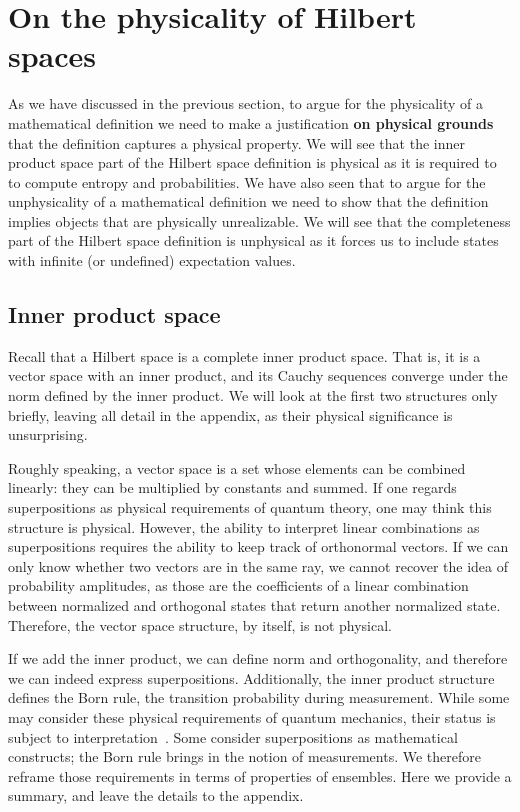 \documentclass[10pt,twocolumn, nofootinbib]{revtex4-2}
\begin{document}
\section{On the physicality of Hilbert spaces}

As we have discussed in the previous section, to argue for the physicality of a mathematical definition we need to make a justification \textbf{on physical grounds} that the definition captures a physical property.  We will see that the inner product space part of the Hilbert space definition is physical as it is required to to compute entropy and probabilities. We have also seen that to argue for the unphysicality of a mathematical definition we need to show that the definition implies objects that are physically unrealizable. We will see that the completeness part of the Hilbert space definition is unphysical as it forces us to include states with infinite (or undefined) expectation values.

\subsection{Inner product space}

Recall that a Hilbert space is a complete inner product space. That is, it is a vector space with an inner product, and its Cauchy sequences converge under the norm defined by the inner product. We will look at the first two structures only briefly, leaving all detail in the appendix, as their physical significance is unsurprising.

Roughly speaking, a vector space is a set whose elements can be combined linearly: they can be multiplied by constants and summed. If one regards superpositions as physical requirements of quantum theory, one may think this structure is physical. However, the ability to interpret linear combinations as superpositions requires the ability to keep track of orthonormal vectors. If we can only know whether two vectors are in the same ray, we cannot recover the idea of probability amplitudes, as those are the coefficients of a linear combination between normalized and orthogonal states that return another normalized state. Therefore, the vector space structure, by itself, is not physical.

If we add the inner product, we can define norm and orthogonality, and therefore we can indeed express superpositions. Additionally, the inner product structure defines the Born rule, the transition probability during measurement. While some may consider these physical requirements of quantum mechanics, their status is subject to interpretation~\cite{albert_quantum_1994, wallace_everett_2013, howard_complementarity_2021, ghirardi_unified_1986}. Some consider superpositions as mathematical constructs; the Born rule brings in the notion of measurements. We therefore reframe those requirements in terms of properties of ensembles. Here we provide a summary, and leave the details to the appendix.
\end{document}
